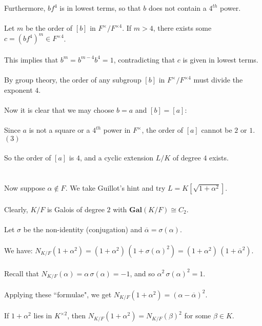 \documentclass{article}
\begin{document}
\indent Furthermore, $bf^4$ is in lowest terms, so that $b$ does not contain a $4^{th}$ power. \\\\
\indent Let $m$ be the order of $[b]$ in $F^\times/F^{\times4}$.  If $m > 4$,  there exists some $c = (bf^{4})^m \in F^{\times 4}$. \\\\
\indent This implies that $b^m = b^{m-4}b^4 = 1$, contradicting that $c$ is given in lowest terms. \\\\
By group theory, the order of any subgroup $[b]$ in $F^\times/F^{\times4}$ must divide the exponent $4$. \\\\
Now it is clear that we may choose $b = a$ and $[b] = [a]$: \\\\
Since $a$ is not a square or a $4^{th}$ power in $F^\times$, the order of $[a]$ cannot be $2$ or $1$. \indent $(3)$ \\\\
So the order of $[a]$ is $4$, and a cyclic extension $L/K$ of degree $4$ exists. \\\\
\\
Now suppose $\alpha \notin F$. We take Guillot's hint and try $L = K[\sqrt{1+\alpha^2}]$. \\\\
Clearly, $K/F$ is Galois of degree $2$ with $\textbf{Gal}(K/F) \cong C_2$. \\\\
Let $\sigma$ be the non-identity (conjugation) and $\overline{\alpha} = \sigma(\alpha)$. \\\\
We have: $N_{K/F}(1 + \alpha^2) = (1 + \alpha^2) \, (1 + \sigma(\alpha)^2) = (1 + \alpha^2) \, (1 + \overline{\alpha}^2).$ \\\\
Recall that $N_{K/F}(\alpha) = \alpha \, \sigma(\alpha) = -1$, and so $\alpha^2 \, \sigma(\alpha)^2 = 1$. \\\\
Applying these ``formulae", we get $N_{K/F}(1 + \alpha^2) = (\alpha - \overline{\alpha})^2$. \\\\
If $1 + \alpha^2$ lies in $K^{\times2}$, then $N_{K/F}(1 + \alpha^2) = N_{K/F}(\beta)^2$ for some $\beta \in K$. \\\\
\end{document}
